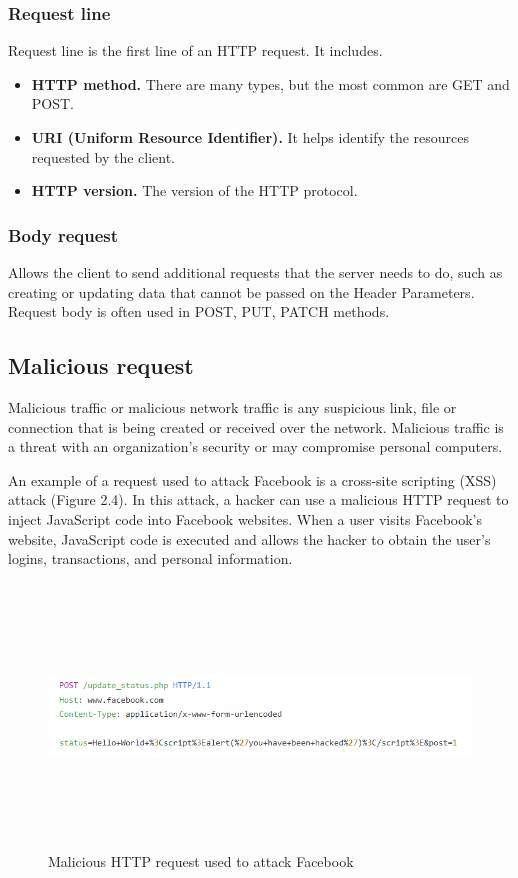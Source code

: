 \subsubsection{Request line}
\hspace{0.5cm}Request line is the first line of an HTTP request. It includes.
\begin{itemize}
	\item \textbf{HTTP method.} There are many types, but the most common are GET and POST.
	\item \textbf{URI (Uniform Resource Identifier).} It helps identify the resources requested by the client.
	\item \textbf{HTTP version.} The version of the HTTP protocol.
\end{itemize}
\subsubsection{Body request}
\hspace{0.5cm}Allows the client to send additional requests that the server needs to do, such as creating or updating data that cannot be passed on the Header Parameters. Request body is often used in POST, PUT, PATCH methods.
\subsection{Malicious request}
\hspace{0.5cm}Malicious traffic or malicious network traffic is any suspicious link, file or connection that is being created or received over the network. Malicious traffic is a threat with an organization's security or may compromise personal computers.

An example of a request used to attack Facebook is a cross-site scripting (XSS) attack (Figure 2.4). In this attack, a hacker can use a malicious HTTP request to inject JavaScript code into Facebook websites. When a user visits Facebook's website, JavaScript code is executed and allows the hacker to obtain the user's logins, transactions, and personal information.

\begin{figure}[ht]
	\centering
	\includegraphics[width=\linewidth, height=7cm,keepaspectratio]{figures/malicious request.png}
	\caption{Malicious HTTP request used to attack Facebook}
\end{figure}

